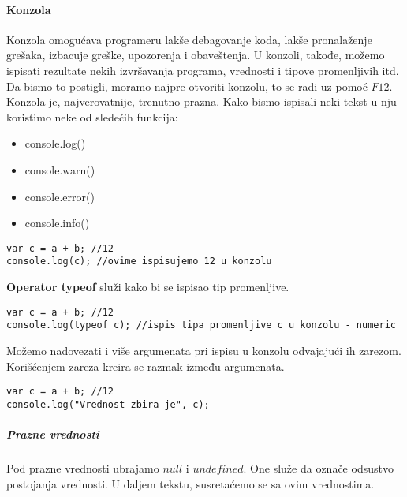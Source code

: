 \paragraph{Konzola}
Konzola omogućava programeru lakše debagovanje koda, lakše pronalaženje grešaka, izbacuje greške, upozorenja i obaveštenja.
U konzoli, takođe, možemo ispisati rezultate nekih izvršavanja programa, vrednosti i tipove promenljivih itd.\\
Da bismo to postigli, moramo najpre otvoriti konzolu, to se radi uz pomoć $F12$. Konzola je, najverovatnije, trenutno prazna. Kako bismo ispisali neki tekst u nju koristimo neke od sledećih funkcija:
\begin{itemize}
    \item console.log()
    \item console.warn()
    \item console.error()
    \item console.info()
\end{itemize}
\begin{lstlisting}[backgroundcolor = \color{lightgray}, breaklines=true]
var c = a + b; //12
console.log(c); //ovime ispisujemo 12 u konzolu
\end{lstlisting}
\textbf{Operator typeof} služi kako bi se ispisao tip promenljive.
\begin{lstlisting}[backgroundcolor = \color{lightgray}, breaklines=true]
var c = a + b; //12
console.log(typeof c); //ispis tipa promenljive c u konzolu - numeric
\end{lstlisting}
Možemo nadovezati i više argumenata pri ispisu u konzolu odvajajući ih zarezom. Korišćenjem zareza kreira se razmak između argumenata.
\begin{lstlisting}[backgroundcolor = \color{lightgray}, breaklines=true]
var c = a + b; //12
console.log("Vrednost zbira je", c); 
\end{lstlisting}

\subparagraph{Prazne vrednosti}
Pod prazne vrednosti ubrajamo $null$ i $undefined$. One služe da označe odsustvo postojanja vrednosti. U daljem tekstu, susretaćemo se sa ovim vrednostima.

